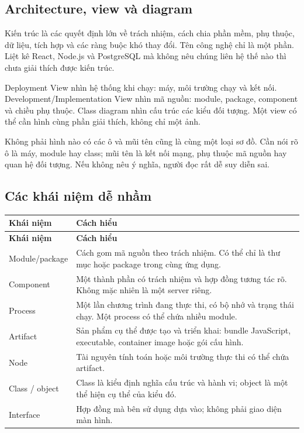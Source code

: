 \subsection{Architecture, view và diagram}
Kiến trúc là các quyết định lớn về trách nhiệm, cách chia phần mềm, phụ thuộc, dữ liệu, tích hợp và các ràng buộc khó thay đổi. Tên công nghệ chỉ là một phần. Liệt kê React, Node.js và PostgreSQL mà không nêu chúng liên hệ thế nào thì chưa giải thích được kiến trúc.

Deployment View nhìn hệ thống khi chạy: máy, môi trường chạy và kết nối. Development/Implementation View nhìn mã nguồn: module, package, component và chiều phụ thuộc. Class diagram nhìn cấu trúc các kiểu đối tượng. Một view có thể cần hình cùng phần giải thích, không chỉ một ảnh.

Không phải hình nào có các ô và mũi tên cũng là cùng một loại sơ đồ. Cần nói rõ ô là máy, module hay class; mũi tên là kết nối mạng, phụ thuộc mã nguồn hay quan hệ đối tượng. Nếu không nêu ý nghĩa, người đọc rất dễ suy diễn sai.

\subsection{Các khái niệm dễ nhầm}
\begin{longtable}{|L{34mm}|L{108mm}|}\hline
\textbf{Khái niệm} & \textbf{Cách hiểu}\\\hline
\endfirsthead
\hline
\textbf{Khái niệm} & \textbf{Cách hiểu}\\\hline
\endhead
Module/package & Cách gom mã nguồn theo trách nhiệm. Có thể chỉ là thư mục hoặc package trong cùng ứng dụng.\\\hline
Component & Một thành phần có trách nhiệm và hợp đồng tương tác rõ. Không mặc nhiên là một server riêng.\\\hline
Process & Một lần chương trình đang thực thi, có bộ nhớ và trạng thái chạy. Một process có thể chứa nhiều module.\\\hline
Artifact & Sản phẩm cụ thể được tạo và triển khai: bundle JavaScript, executable, container image hoặc gói cấu hình.\\\hline
Node & Tài nguyên tính toán hoặc môi trường thực thi có thể chứa artifact.\\\hline
Class / object & Class là kiểu định nghĩa cấu trúc và hành vi; object là một thể hiện cụ thể của kiểu đó.\\\hline
Interface & Hợp đồng mà bên sử dụng dựa vào; không phải giao diện màn hình.\\\hline
\end{longtable}

